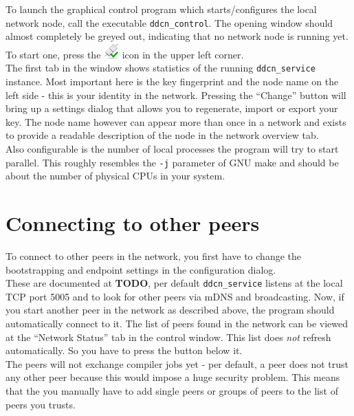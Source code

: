 \documentclass[a4paper,9pt]{scrartcl}
\begin{document}
To launch the graphical control program which starts/configures the local network node, call the executable \texttt{ddcn\_control}. The opening window should almost completely be greyed out, indicating that no network node is running yet. To start one, press the 
\includegraphics[scale=0.1,keepaspectratio=true]{../ddcn_control/icons/network-connect.png} icon in the upper left corner.\\
\smallskip
The first tab in the window shows statistics of the running \texttt{ddcn\_service} instance. Most important here is the key fingerprint and the node name on the left side - this is your identity in the network. Pressing the ``Change'' button will bring up a settings dialog that allows you to regenerate, import or export your key. The node name however can appear more than once in a network and exists to provide a readable description of the node in the network overview tab.\\
\smallskip
Also configurable is the number of local processes the program will try to start parallel. This roughly resembles the \texttt{-j} parameter of GNU make and should be about the number of physical CPUs in your system.

\section{Connecting to other peers}

To connect to other peers in the network, you first have to change the bootstrapping and endpoint settings in the configuration dialog.\\These are documented at \textbf{TODO}, per default \texttt{ddcn\_service} listens at the local TCP port 5005 and %
to look for other peers via mDNS and broadcasting. Now, if you start another peer in the network as described above, the program should automatically connect to it. The list of peers found in the network can be viewed at the ``Network Status'' tab in the control window. This list does \textit{not} refresh automatically. So you have to press the button below it.\\
The peers will not exchange compiler jobs yet - per default, a peer does not trust any other peer because this would impose a huge security problem. This means that the you manually have to add single peers or groups of peers to the list of peers you trusts.
\end{document}
